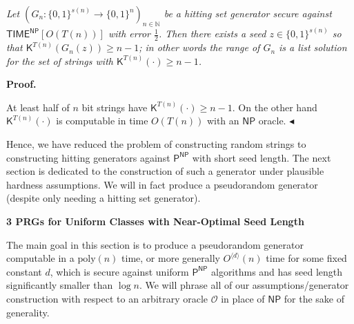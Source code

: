 \emph{Let $(G_{n}:\{0,1\}^{s(n)}\to\{0,1\}^{n})_{n\in\mathbb{N}}$ be a hitting set generator secure against ${\mathsf{TIME}}^{\mathsf{NP}}[O(T(n))]$ with error $\frac{1}{2}$. Then there exists a seed $z\in\{0,1\}^{s(n)}$ so that ${\mathsf{K}}^{T(n)}(G_{n}(z))\geq n-1$; in other words the range of $G_{n}$ is a list solution for the set of strings with ${\mathsf{K}}^{T(n)}(\cdot)\geq n-1$.}\par







\par\medskip\noindent\textbf{Proof.}\par




At least half of $n$ bit strings have ${\mathsf{K}}^{T(n)}(\cdot)\geq n-1$. On the other hand ${\mathsf{K}}^{T(n)}(\cdot)$ is computable in time $O(T(n))$ with an ${\mathsf{NP}}$ oracle.
$\blacktriangleleft$\par




Hence, we have reduced the problem of constructing random strings to constructing hitting generators against ${\mathsf{P}}^{{\mathsf{NP}}}$ with short seed length. The next section is dedicated to the construction of such a generator under plausible hardness assumptions. We will in fact produce a pseudorandom generator (despite only needing a hitting set generator).\par







\par\medskip\noindent\textbf{
3 PRGs for Uniform Classes with Near-Optimal Seed Length}\par




The main goal in this section is to produce a pseudorandom generator computable in a $\mathrm{poly}(n)$ time, or more generally $O^{\langle d\rangle}(n)$ time for some fixed constant $d$, which is secure against uniform ${\mathsf{P}}^{{\mathsf{NP}}}$ algorithms and has seed length significantly smaller than $\log n$. We will phrase all of our assumptions/generator construction with respect to an arbitrary oracle $\mathcal{O}$ in place of ${\mathsf{NP}}$ for the sake of generality.\par




